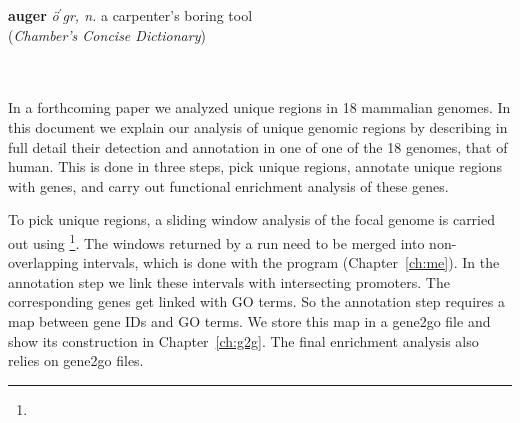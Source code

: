 \hspace{6.5cm}\begin{minipage}{10cm}\textbf{auger} \emph{\"o$^\prime$g\schwa r, n.} a carpenter's
boring tool\\(\emph{Chamber's Concise Dictionary})
\end{minipage}\\\\
In a forthcoming paper we analyzed unique regions in 18 mammalian
genomes. In this document we explain our analysis of unique genomic
regions by describing in full detail their detection and annotation in
one of one of the 18 genomes, that of human. This is done in three
steps, pick unique regions, annotate unique regions with genes, and
carry out functional enrichment analysis of these genes.

To pick unique regions, a sliding window analysis of the focal genome
is carried out
using \footnote{}. The
windows returned by a  run need to be merged into
non-overlapping intervals, which is done with the program 
(Chapter~\ref{ch:me}). In the annotation step we link these intervals
with intersecting promoters. The corresponding genes get linked with
GO terms. So the annotation step requires a map between gene IDs and
GO terms. We store this map in a gene2go file and show its
construction in Chapter~\ref{ch:g2g}. The final enrichment analysis
also relies on gene2go files.
